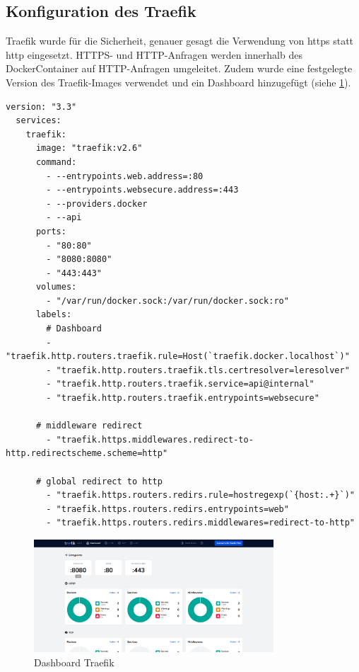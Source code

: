 \subsection{Konfiguration des Traefik}
Traefik wurde für die Sicherheit, genauer gesagt die Verwendung von https statt http eingesetzt.
HTTPS- und HTTP-Anfragen werden innerhalb des DockerContainer auf HTTP-Anfragen umgeleitet.
Zudem wurde eine festgelegte Version des Traefik-Images verwendet und ein Dashboard hinzugefügt (siehe \ref{fig:treafikDashboard}). 
\begin{lstlisting}[caption=Starten Traefik, label=lst:Traefik]
  version: "3.3"
  services:
    traefik:
      image: "traefik:v2.6"
      command:
        - --entrypoints.web.address=:80
        - --entrypoints.websecure.address=:443
        - --providers.docker
        - --api
      ports:
        - "80:80"
        - "8080:8080"
        - "443:443"
      volumes:
        - "/var/run/docker.sock:/var/run/docker.sock:ro"
      labels:
        # Dashboard
        - "traefik.http.routers.traefik.rule=Host(`traefik.docker.localhost`)"
        - "traefik.http.routers.traefik.tls.certresolver=leresolver"
        - "traefik.http.routers.traefik.service=api@internal"
        - "traefik.http.routers.traefik.entrypoints=websecure"
  
      # middleware redirect
        - "traefik.https.middlewares.redirect-to-http.redirectscheme.scheme=http"
  
      # global redirect to http
        - "traefik.https.routers.redirs.rule=hostregexp(`{host:.+}`)"
        - "traefik.https.routers.redirs.entrypoints=web"
        - "traefik.https.routers.redirs.middlewares=redirect-to-http"
\end{lstlisting}

\begin{figure}[H]
  \includegraphics[width=0.8\textwidth]{pics/TreafikDashboard.PNG}
  \centering
  \caption{Dashboard Traefik}
  \label{fig:treafikDashboard}
\end{figure}

